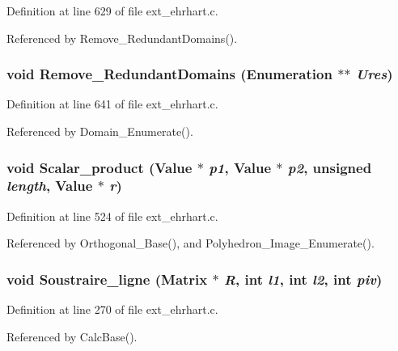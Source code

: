 Definition at line 629 of file ext\_\-ehrhart.c.

Referenced by Remove\_\-Redundant\-Domains().

\subsubsection{\setlength{\rightskip}{0pt plus 5cm}void Remove\_\-Redundant\-Domains (Enumeration $\ast$$\ast$ {\em Ures})}\label{ext__ehrhart_8c_a14}




Definition at line 641 of file ext\_\-ehrhart.c.

Referenced by Domain\_\-Enumerate().

\subsubsection{\setlength{\rightskip}{0pt plus 5cm}void Scalar\_\-product (Value $\ast$ {\em p1}, Value $\ast$ {\em p2}, unsigned {\em length}, Value $\ast$ {\em r})}\label{ext__ehrhart_8c_a10}




Definition at line 524 of file ext\_\-ehrhart.c.

Referenced by Orthogonal\_\-Base(), and Polyhedron\_\-Image\_\-Enumerate().

\subsubsection{\setlength{\rightskip}{0pt plus 5cm}void Soustraire\_\-ligne (Matrix $\ast$ {\em R}, int {\em l1}, int {\em l2}, int {\em piv})\hspace{0.3cm}{\tt  [static]}}\label{ext__ehrhart_8c_a4}




Definition at line 270 of file ext\_\-ehrhart.c.

Referenced by Calc\-Base().

